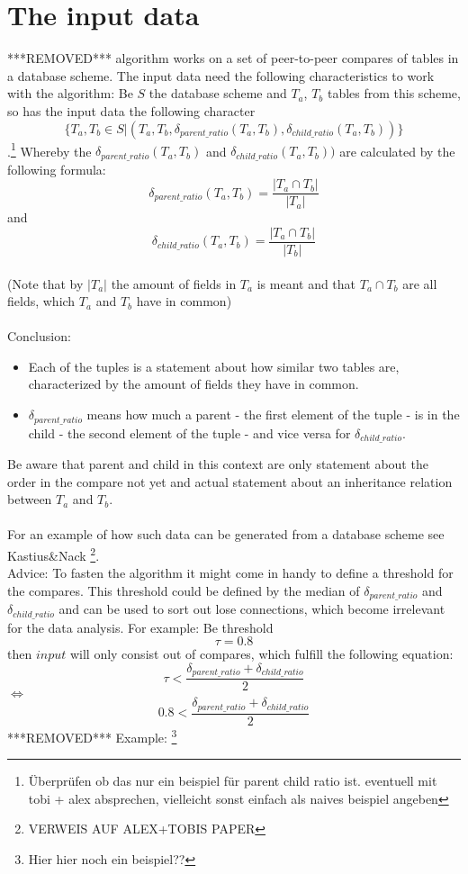 \documentclass[10pt, journal, twocolumn]{IEEEtran}
\begin{document}
\section{The input data}
***REMOVED***
 algorithm works on a set of peer-to-peer compares of tables in a database scheme. The input data need the following characteristics to work with the algorithm: Be $S$ the database scheme and $T_a$, $T_b$ tables from this scheme, so has the input data the following character 
$$\{T_a, T_b \in S | (T_a, T_b, \delta_{parent\_ratio}(T_a, T_b),\delta_{child\_ratio}(T_a, T_b))\}$$\hspace{-300cm} 
.\footnote{Überprüfen ob das nur ein beispiel für parent child ratio ist. eventuell mit tobi + alex absprechen, vielleicht sonst einfach als naives beispiel angeben} Whereby the $\delta_{parent\_ratio}(T_a, T_b)$ and $\delta_{child\_ratio}(T_a, T_b))$ are calculated by the following formula: $$\delta_{parent\_ratio}(T_a, T_b) = \frac{ | T_a \cap T_b |}{ | T_a |} $$ and  $$\delta_{child\_ratio}(T_a, T_b) = \frac{ | T_a \cap T_b |}{ | T_b |} $$\\
(Note that by $| T_a |$ the amount of fields in $T_a$ is meant and that $T_a \cap T_b$ are all fields, which $T_a$ and $T_b$ have in common)\\
\\Conclusion:
\begin{itemize}
\item Each of the tuples is a statement about how similar two tables are, characterized by the amount of fields they have in common. 
\item $\delta_{parent\_ratio}$ means how much a parent - the first element of the tuple - is in the child - the second element of the tuple - and vice versa for $\delta_{child\_ratio}$.
\end{itemize}
Be aware that parent and child in this context are only statement about the order in the compare not yet and actual statement about an inheritance relation between $T_a$ and $T_b$.\\
\\For an example of how such data can be generated from a database scheme see Kastius\&Nack \footnote{VERWEIS AUF ALEX+TOBIS PAPER}.\\
Advice: To fasten the algorithm it might come in handy to define a threshold for the compares. This threshold could be defined by the median of $\delta_{parent\_ratio}$ and $\delta_{child\_ratio}$ and can be used to sort out lose connections, which become irrelevant for the data analysis. For example: Be threshold $$ \tau = 0.8$$ then $input$ will only consist out of compares, which fulfill the following equation: $$ \tau < \frac{\delta_{parent\_ratio} +  \delta_{child\_ratio}}{2} $$ $\Leftrightarrow$ $$0.8 < \frac{\delta_{parent\_ratio} +  \delta_{child\_ratio}}{2} $$
***REMOVED***
Example: \footnote{Hier hier noch ein beispiel??}
\end{document}
